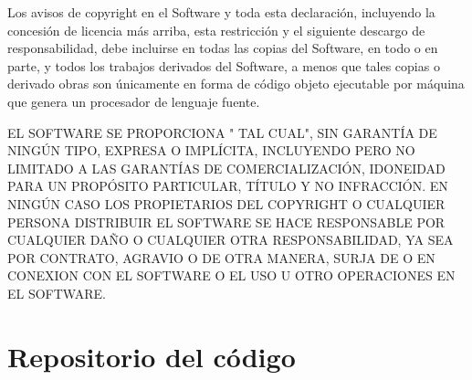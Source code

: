 \documentclass[twoside,letterpaper,12pt]{report}
\begin{document}
Los avisos de copyright en el Software y toda esta declaración, incluyendo
la concesión de licencia más arriba, esta restricción y el siguiente descargo de responsabilidad,
debe incluirse en todas las copias del Software, en todo o en parte, y
todos los trabajos derivados del Software, a menos que tales copias o derivado
obras son únicamente en forma de código objeto ejecutable por máquina que genera
un procesador de lenguaje fuente.

EL SOFTWARE SE PROPORCIONA " TAL CUAL", SIN GARANTÍA DE NINGÚN TIPO, EXPRESA O
IMPLÍCITA, INCLUYENDO PERO NO LIMITADO A LAS GARANTÍAS DE COMERCIALIZACIÓN,
IDONEIDAD PARA UN PROPÓSITO PARTICULAR, TÍTULO Y NO INFRACCIÓN. EN NINGÚN CASO
LOS PROPIETARIOS DEL COPYRIGHT O CUALQUIER PERSONA DISTRIBUIR EL SOFTWARE SE HACE RESPONSABLE
POR CUALQUIER DAÑO O CUALQUIER OTRA RESPONSABILIDAD, YA SEA POR CONTRATO, AGRAVIO O DE OTRA MANERA,
SURJA DE O EN CONEXION CON EL SOFTWARE O EL USO U OTRO
OPERACIONES EN EL SOFTWARE.


\newpage



	


\newpage

\appendix
\chapter{Repositorio del código}

\end{document}
